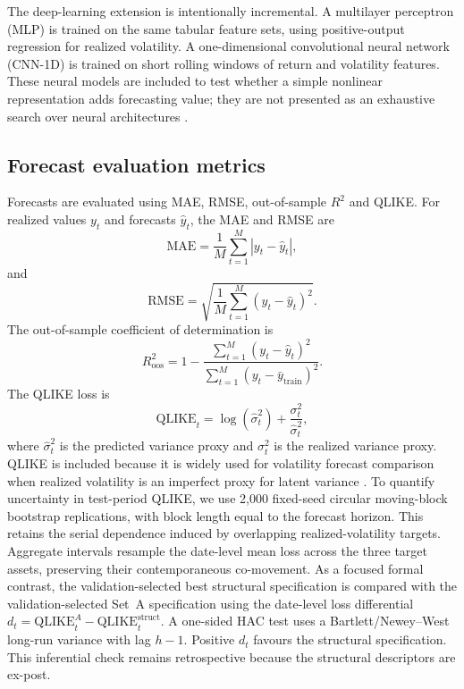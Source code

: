 The deep-learning extension is intentionally incremental. A multilayer perceptron (MLP) is trained on the same tabular feature sets, using positive-output regression for realized volatility. A one-dimensional convolutional neural network (CNN-1D) is trained on short rolling windows of return and volatility features. These neural models are included to test whether a simple nonlinear representation adds forecasting value; they are not presented as an exhaustive search over neural architectures \cite{bucci_2020_realized,christensen_2022_realized}.

\subsection{Forecast evaluation metrics}
\label{subsec:evaluation_method}

Forecasts are evaluated using MAE, RMSE, out-of-sample $R^2$ and QLIKE. For realized values $y_t$ and forecasts $\hat{y}_t$, the MAE and RMSE are
\begin{equation}
\mathrm{MAE}
=
\frac{1}{M}
\sum_{t=1}^{M}
|y_t-\hat{y}_t|,
\end{equation}
and
\begin{equation}
\mathrm{RMSE}
=
\sqrt{
\frac{1}{M}
\sum_{t=1}^{M}
(y_t-\hat{y}_t)^2
}.
\end{equation}
The out-of-sample coefficient of determination is
\begin{equation}
R_{\mathrm{oos}}^{2}
=
1
-
\frac{
\sum_{t=1}^{M}
(y_t-\hat{y}_t)^2
}{
\sum_{t=1}^{M}
(y_t-\bar{y}_{\mathrm{train}})^2
}.
\end{equation}
The QLIKE loss is
\begin{equation}
\mathrm{QLIKE}_t
=
\log(\hat{\sigma}_t^2)
+
\frac{\sigma_t^2}{\hat{\sigma}_t^2},
\end{equation}
where $\hat{\sigma}_t^2$ is the predicted variance proxy and $\sigma_t^2$ is the realized variance proxy. QLIKE is included because it is widely used for volatility forecast comparison when realized volatility is an imperfect proxy for latent variance \cite{patton_2011_volatility}. To quantify uncertainty in test-period QLIKE, we use 2,000 fixed-seed circular moving-block bootstrap replications, with block length equal to the forecast horizon. This retains the serial dependence induced by overlapping realized-volatility targets. Aggregate intervals resample the date-level mean loss across the three target assets, preserving their contemporaneous co-movement. As a focused formal contrast, the validation-selected best structural specification is compared with the validation-selected Set~A specification using the date-level loss differential $d_t=\mathrm{QLIKE}^{A}_t-\mathrm{QLIKE}^{\mathrm{struct}}_t$. A one-sided HAC test uses a Bartlett/Newey--West long-run variance with lag $h-1$. Positive $d_t$ favours the structural specification. This inferential check remains retrospective because the structural descriptors are ex-post.
